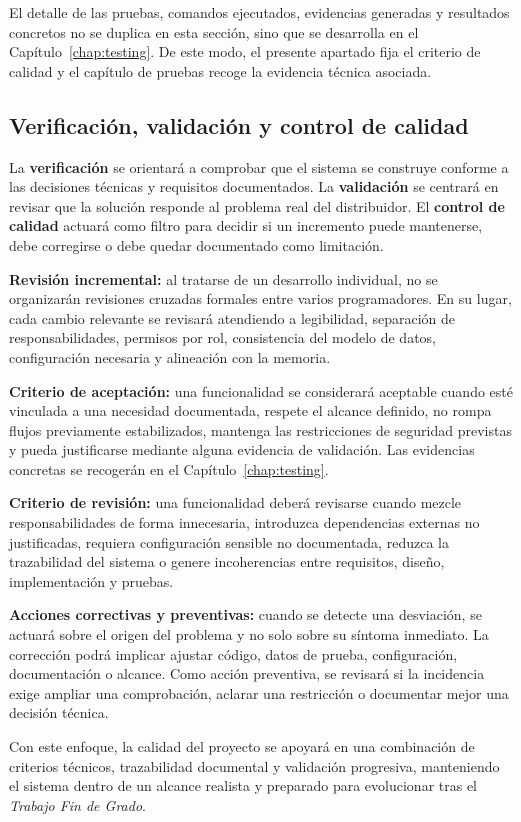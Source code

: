 El detalle de las pruebas, comandos ejecutados, evidencias generadas y resultados concretos no se duplica en esta sección, sino que se desarrolla en el Capítulo~\ref{chap:testing}. De este modo, el presente apartado fija el criterio de calidad y el capítulo de pruebas recoge la evidencia técnica asociada.

\subsection{Verificación, validación y control de calidad}
\label{subsec:quality-verification-validation}

La \textbf{verificación} se orientará a comprobar que el sistema se construye conforme a las decisiones técnicas y requisitos documentados. La \textbf{validación} se centrará en revisar que la solución responde al problema real del distribuidor. El \textbf{control de calidad} actuará como filtro para decidir si un incremento puede mantenerse, debe corregirse o debe quedar documentado como limitación.

\textbf{Revisión incremental:} al tratarse de un desarrollo individual, no se organizarán revisiones cruzadas formales entre varios programadores. En su lugar, cada cambio relevante se revisará atendiendo a legibilidad, separación de responsabilidades, permisos por rol, consistencia del modelo de datos, configuración necesaria y alineación con la memoria.

\textbf{Criterio de aceptación:} una funcionalidad se considerará aceptable cuando esté vinculada a una necesidad documentada, respete el alcance definido, no rompa flujos previamente estabilizados, mantenga las restricciones de seguridad previstas y pueda justificarse mediante alguna evidencia de validación. Las evidencias concretas se recogerán en el Capítulo~\ref{chap:testing}.

\textbf{Criterio de revisión:} una funcionalidad deberá revisarse cuando mezcle responsabilidades de forma innecesaria, introduzca dependencias externas no justificadas, requiera configuración sensible no documentada, reduzca la trazabilidad del sistema o genere incoherencias entre requisitos, diseño, implementación y pruebas.

\textbf{Acciones correctivas y preventivas:} cuando se detecte una desviación, se actuará sobre el origen del problema y no solo sobre su síntoma inmediato. La corrección podrá implicar ajustar código, datos de prueba, configuración, documentación o alcance. Como acción preventiva, se revisará si la incidencia exige ampliar una comprobación, aclarar una restricción o documentar mejor una decisión técnica.

Con este enfoque, la calidad del proyecto se apoyará en una combinación de criterios técnicos, trazabilidad documental y validación progresiva, manteniendo el sistema dentro de un alcance realista y preparado para evolucionar tras el \textit{Trabajo Fin de Grado}.
